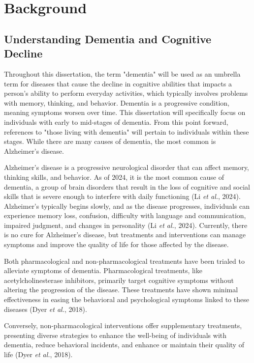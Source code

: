 \documentclass{l4proj}
\begin{document}
\chapter{Background}

\section{Understanding Dementia and Cognitive Decline}

Throughout this dissertation, the term "dementia" will be used as an umbrella term for diseases that cause the decline in cognitive abilities that impacts a person's ability to perform everyday activities, which typically involves problems with memory, thinking, and behavior. Dementia is a progressive condition, meaning symptoms worsen over time. This dissertation will specifically focus on individuals with early to mid-stages of dementia. From this point forward, references to "those living with dementia" will pertain to individuals within these stages. While there are many causes of dementia, the most common is Alzheimer's disease.

Alzheimer's disease is a progressive neurological disorder that can affect memory, thinking skills, and behavior. As of 2024, it is the most common cause of dementia, a group of brain disorders that result in the loss of cognitive and social skills that is severe enough to interfere with daily functioning (Li \emph{et al.}, 2024). Alzheimer's typically begins slowly, and as the disease progresses, individuals can experience memory loss, confusion, difficulty with language and communication, impaired judgment, and changes in personality (Li \emph{et al.}, 2024). Currently, there is no cure for Alzheimer's disease, but treatments and interventions can manage symptoms and improve the quality of life for those affected by the disease.

Both pharmacological and non-pharmacological treatments have been trialed to alleviate symptoms of dementia. Pharmacological treatments, like acetylcholinesterase inhibitors, primarily target cognitive symptoms without altering the progression of the disease. These treatments have shown minimal effectiveness in easing the behavioral and psychological symptoms linked to these diseases (Dyer \emph{et al.}, 2018).

Conversely, non-pharmacological interventions offer supplementary treatments, presenting diverse strategies to enhance the well-being of individuals with dementia, reduce behavioral incidents, and enhance or maintain their quality of life (Dyer \emph{et al.}, 2018).
\end{document}
